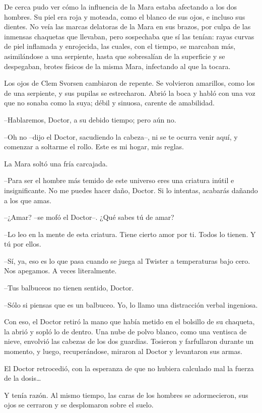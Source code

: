 De cerca pudo ver cómo la influencia de la Mara estaba afectando a los dos hombres. Su piel era roja y moteada, como el blanco de sus ojos, e incluso sus dientes. No veía las marcas delatoras de la Mara en sus brazos, por culpa de las inmensas chaquetas que llevaban, pero sospechaba que sí las tenían: rayas curvas de piel inflamada y enrojecida, las cuales, con el tiempo, se marcaban más, asimilándose a una serpiente, hasta que sobresalían de la superficie y se despegaban, brotes físicos de la misma Mara, infectando al que la tocara.

Los ojos de Clem Svorsen cambiaron de repente. Se volvieron amarillos, como los de una serpiente, y sus pupilas se estrecharon. Abrió la boca y habló con una voz que no sonaba como la suya; débil y sinuosa, carente de amabilidad.

--Hablaremos, Doctor, a su debido tiempo; pero aún no.

--Oh no --dijo el Doctor, sacudiendo la cabeza--, ni se te ocurra venir aquí, y comenzar a soltarme el rollo. Este es mi hogar, mis reglas.

La Mara soltó una fría carcajada.

--Para ser el hombre más temido de este universo eres una criatura inútil e insignificante. No me puedes hacer daño, Doctor. Si lo intentas, acabarás dañando a los que amas.

--¿Amar? --se mofó el Doctor--. ¿Qué sabes tú de amar?

--Lo leo en la mente de esta criatura. Tiene cierto amor por ti. Todos lo tienen. Y tú por ellos.

--Sí, ya, eso es lo que pasa cuando se juega al Twister a temperaturas bajo cero. Nos apegamos. A veces literalmente.

--Tus balbuceos no tienen sentido, Doctor.

--Sólo si piensas que es un balbuceo. Yo, lo llamo una distracción verbal ingeniosa.

Con eso, el Doctor retiró la mano que había metido en el bolsillo de su chaqueta, la abrió y sopló lo de dentro. Una nube de polvo blanco, como una ventisca de nieve, envolvió las cabezas de los dos guardias. Tosieron y farfullaron durante un momento, y luego, recuperándose, miraron al Doctor y levantaron sus armas.

El Doctor retrocedió, con la esperanza de que no hubiera calculado mal la fuerza de la dosis…

Y tenía razón. Al mismo tiempo, las caras de los hombres se adormecieron, sus ojos se cerraron y se desplomaron sobre el suelo.

